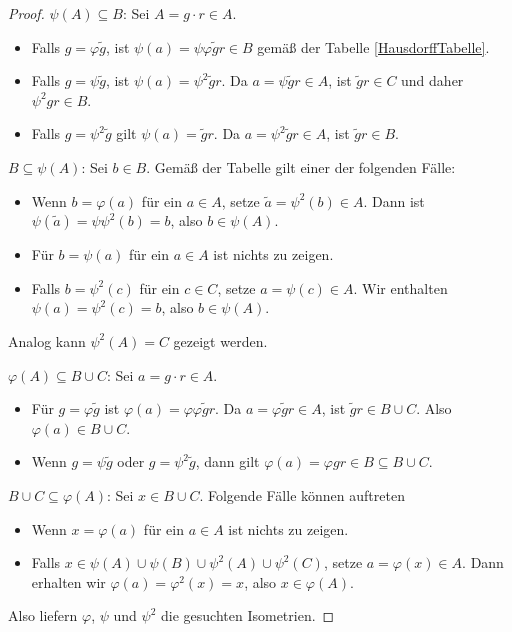 \begin{proof}
	$\psi(A)\subseteq B$: Sei $A=g\cdot r \in A$.
	\begin{itemize}
		\item Falls $g=\varphi\tilde{g}$, ist $\psi(a)=\psi\varphi\tilde{g}r\in B$ gemäß der Tabelle \ref{HausdorffTabelle}.
		\item Falls $g=\psi\tilde{g}$, ist $\psi(a)=\psi^2\tilde{g}r$. Da $a=\psi\tilde{g}r\in A$, ist $\tilde{g}r\in C$ und daher $\psi^2gr\in B$.
		\item Falls $g=\psi^2\tilde{g}$ gilt $\psi(a)=\tilde{g}r$. Da $a=\psi^2\tilde{g}r\in A$, ist $\tilde{g}r\in B$.
	\end{itemize}
	\par
	
	$B\subseteq\psi(A)$: Sei $b\in B$. Gemäß der Tabelle gilt einer der folgenden Fälle:
	\begin{itemize}
		\item Wenn $b=\varphi(a)$ für ein $a\in A$, setze $\tilde{a}=\psi^2(b)\in A$. Dann ist $\psi(\tilde{a})=\psi\psi^2(b)=b$, also $b\in\psi(A)$.
		\item Für $b=\psi(a)$ für ein $a\in A$ ist nichts zu zeigen.
		\item Falls $b=\psi^2(c)$ für ein $c\in C$, setze $a=\psi(c)\in A$. Wir enthalten $\psi(a)=\psi^2(c)=b$, also $b\in\psi(A)$.
	\end{itemize}
	\par

	Analog kann $\psi^2(A)=C$ gezeigt werden.
	\par
	
	$\varphi(A)\subseteq B\cup C$: Sei $a=g\cdot r\in A$.
	\begin{itemize}
		\item Für $g=\varphi\tilde{g}$ ist $\varphi(a)=\varphi\varphi\tilde{g}r$. Da $a=\varphi\tilde{g}r\in A$, ist $\tilde{g}r\in B\cup C$. Also $\varphi(a)\in B\cup C$.
		\item Wenn $g=\psi\tilde{g}$ oder $g=\psi^2\tilde{g}$, dann gilt $\varphi(a)=\varphi gr\in B\subseteq B\cup C$.
	\end{itemize}
	\par

	$B\cup C\subseteq\varphi(A)$: Sei $x\in B\cup C$. Folgende Fälle können auftreten
	\begin{itemize}
		\item Wenn $x=\varphi(a)$ für ein $a\in A$ ist nichts zu zeigen.
		\item Falls $x\in\psi(A)\cup\psi(B)\cup\psi^2(A)\cup\psi^2(C)$, setze $a=\varphi(x)\in A$. Dann erhalten wir $\varphi(a)=\varphi^2(x)=x$, also $x\in \varphi(A)$.
	\end{itemize}

	Also liefern $\varphi$, $\psi$ und $\psi^2$ die gesuchten Isometrien.
\end{proof}

